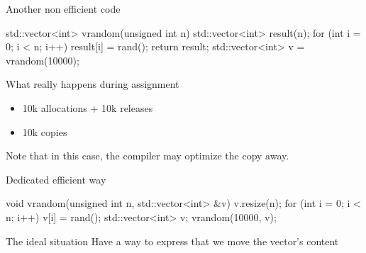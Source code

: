 \begin{frame}[fragile]
  \begin{exampleblock}{Another non efficient code}
    \begin{cppcode*}{}
      std::vector<int> vrandom(unsigned int n) {
        std::vector<int> result(n);
        for (int i = 0; i < n; i++) {
          result[i] = rand();
        }
        return result;
      }
      std::vector<int> v = vrandom(10000);
    \end{cppcode*}
  \end{exampleblock}
  \pause
  \begin{alertblock}{What really happens during assignment}
    \begin{itemize}
    \item 10k allocations + 10k releases
    \item 10k copies
    \end{itemize}
    Note that in this case, the compiler may optimize the copy away.
  \end{alertblock}
\end{frame}

\begin{frame}[fragile]
  \begin{exampleblock}{Dedicated efficient way}
    \begin{cppcode*}{}
      void vrandom(unsigned int n, std::vector<int> &v) {
        v.resize(n);
        for (int i = 0; i < n; i++) {
          v[i] = rand();
        }
      }
      std::vector<int> v;
      vrandom(10000, v);
    \end{cppcode*}
  \end{exampleblock}
  \pause
  \begin{block}{The ideal situation}
    Have a way to express that we move the vector's content
  \end{block}
\end{frame}

